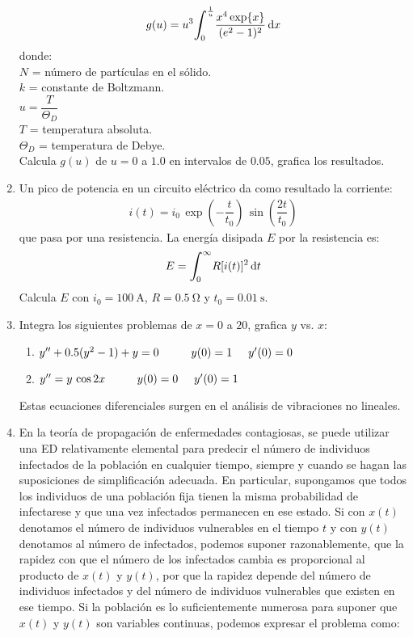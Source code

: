 \begin{enumerate}
\begin{align*}
g (u) = u^{3} \scaleint{6ex}_{\bs 0}^{\frac{1}{u}} \dfrac{x^{4} \exp{x}}{(e^{2} - 1)^{2}} \dd{x}
\end{align*}
donde: \\
$N$ = número de partículas en el sólido. \\
$k$ = constante de Boltzmann. \\[0.5em]
$u = \dfrac{T}{\Theta_{D}}$ \\
$T$ = temperatura absoluta. \\
$\Theta_{D}$ = temperatura de Debye. \\
Calcula $g (u)$ de $u = 0$ a $1.0$ en intervalos de $0.05$, grafica los resultados.
\item Un pico de potencia en un circuito eléctrico da como resultado la corriente:
\begin{align*}
i (t) = i_{0} \, \exp\left( - \dfrac{t}{t_{0}} \right) \, \sin \left( \dfrac{2 t}{t_{0}} \right)
\end{align*}
que pasa por una resistencia. La energía disipada $E$ por la resistencia es:
\begin{align*}
E = \scaleint{6ex}_{\bs 0}^{\infty} R [i (t)]^{2} \dd{t}
\end{align*}
Calcula $E$ con $i_{0} = \SI{100}{\ampere}$, $R = \SI{0.5}{\ohm}$ y $t_{0} = \SI{0.01}{\second}$.
\item Integra los siguientes problemas de $x = 0$ a $20$, grafica $y$ vs. $x$:
\begin{enumerate}
\item ${y}^{\prime \prime} + 0.5 (y^{2} - 1) + y = 0 \hspace{1cm} y (0) = 1 \hspace{0.5cm} {y}^{\prime} (0) = 0$
\item ${y}^{\prime \prime} = y \, \cos 2 x \hspace{1cm} y (0) = 0 \hspace{0.5cm} {y}^{\prime} (0) = 1$
\end{enumerate}
Estas ecuaciones diferenciales surgen en el análisis de vibraciones no lineales.
\item En la teoría de propagación de enfermedades contagiosas, se puede utilizar una ED relativamente elemental para predecir el número de individuos infectados de la población en cualquier tiempo, siempre y cuando se hagan las suposiciones de simplificación adecuada. En particular, supongamos que todos los individuos de una población fija tienen la misma probabilidad de infectarese y que una vez infectados permanecen en ese estado. Si con $ x(t)$ denotamos el número de individuos vulnerables en el tiempo $t$ y con $y (t)$ denotamos al número de infectados, podemos suponer razonablemente, que la rapidez con que el número de los infectados cambia es proporcional al producto de $x (t)$ y $y (t)$, por que la rapidez depende del número de individuos infectados y del número de individuos vulnerables que existen en ese tiempo. Si la población es lo suficientemente numerosa para suponer que $x (t)$ y $y (t)$ son variables continuas, podemos expresar el problema como:

\end{enumerate}
